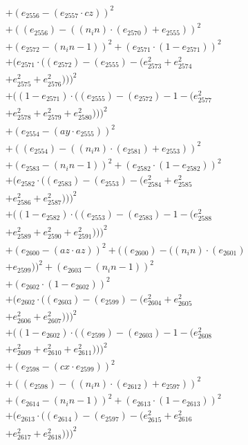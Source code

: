 \documentclass[10pt, a4paper]{article}
\begin{document}
\begin{small}
\begin{align*}
& + (e_{2556} - (e_{2557}  \cdot  cz))^{2} \\
& + ((e_{2556}) - ((n_in)  \cdot  (e_{2570}) + e_{2555}))^{2} \\
& + (e_{2572} - (n_in - 1))^{2} + (e_{2571}  \cdot  (1 - e_{2571}))^{2} \\
& + (e_{2571}  \cdot  ((e_{2572}) - (e_{2555}) - (e_{2573}^{2} + e_{2574}^{2} \\
& + e_{2575}^{2} + e_{2576}^{2})))^{2} \\
& + ((1 - e_{2571})  \cdot  ((e_{2555}) - (e_{2572}) - 1 - (e_{2577}^{2} \\
& + e_{2578}^{2} + e_{2579}^{2} + e_{2580}^{2})))^{2} \\
& + (e_{2554} - (ay  \cdot  e_{2555}))^{2} \\
& + ((e_{2554}) - ((n_in)  \cdot  (e_{2581}) + e_{2553}))^{2} \\
& + (e_{2583} - (n_in - 1))^{2} + (e_{2582}  \cdot  (1 - e_{2582}))^{2} \\
& + (e_{2582}  \cdot  ((e_{2583}) - (e_{2553}) - (e_{2584}^{2} + e_{2585}^{2} \\
& + e_{2586}^{2} + e_{2587}^{2})))^{2} \\
& + ((1 - e_{2582})  \cdot  ((e_{2553}) - (e_{2583}) - 1 - (e_{2588}^{2} \\
& + e_{2589}^{2} + e_{2590}^{2} + e_{2591}^{2})))^{2} \\
& + (e_{2600} - (az  \cdot  az))^{2} + ((e_{2600}) - ((n_in)  \cdot  (e_{2601}) \\
& + e_{2599}))^{2} + (e_{2603} - (n_in - 1))^{2} \\
& + (e_{2602}  \cdot  (1 - e_{2602}))^{2} \\
& + (e_{2602}  \cdot  ((e_{2603}) - (e_{2599}) - (e_{2604}^{2} + e_{2605}^{2} \\
& + e_{2606}^{2} + e_{2607}^{2})))^{2} \\
& + ((1 - e_{2602})  \cdot  ((e_{2599}) - (e_{2603}) - 1 - (e_{2608}^{2} \\
& + e_{2609}^{2} + e_{2610}^{2} + e_{2611}^{2})))^{2} \\
& + (e_{2598} - (cx  \cdot  e_{2599}))^{2} \\
& + ((e_{2598}) - ((n_in)  \cdot  (e_{2612}) + e_{2597}))^{2} \\
& + (e_{2614} - (n_in - 1))^{2} + (e_{2613}  \cdot  (1 - e_{2613}))^{2} \\
& + (e_{2613}  \cdot  ((e_{2614}) - (e_{2597}) - (e_{2615}^{2} + e_{2616}^{2} \\
& + e_{2617}^{2} + e_{2618}^{2})))^{2} \\

\end{align*}
\end{small}
\end{document}
